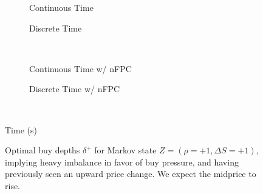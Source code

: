 \begin{figure}
\centering
\begin{subfigure}{.45\linewidth}
  \centering
  \setlength\figureheight{\linewidth} 
  \setlength\figurewidth{\linewidth}
  
  \caption{Continuous Time}
\end{subfigure}%
\hfill%
\begin{subfigure}{.45\linewidth}
  \centering
  \setlength\figureheight{\linewidth} 
  \setlength\figurewidth{\linewidth}
   
  \caption{Discrete Time}
\end{subfigure}\\
\vspace{1cm}
\begin{subfigure}{.45\linewidth}
  \centering
  \setlength\figureheight{\linewidth} 
  \setlength\figurewidth{\linewidth}
   
  \caption{Continuous Time w/ nFPC}
\end{subfigure}%
\hfill%
\begin{subfigure}{.45\linewidth}
  \centering
  \setlength\figureheight{\linewidth} 
  \setlength\figurewidth{\linewidth}
   
  \caption{Discrete Time w/ nFPC}
\end{subfigure}\\

\leavevmode{}\hspace{0pt plus 1filll}\null

Time (s)

\vspace{1cm}
\begin{subfigure}{\linewidth}
  \centering
   
\end{subfigure}%
  \caption{Optimal buy depths $\delta^{+}$ for Markov state $Z=(\rho = +1, \Delta S = +1)$, implying heavy imbalance in favor of buy pressure, and having previously seen an upward price change. We expect the midprice to rise.}
  \label{fig:comp_dp_z15}
\end{figure}

